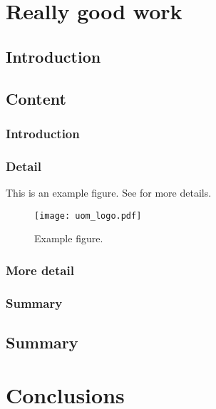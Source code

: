   
  
\chapter{Really good work}

  \section{Introduction}
  \lipsum[1] 
  
  \section{Content}
    \subsection{Introduction}
	\lipsum[1]
	
	\subsection{Detail}
    \lipsum[1-2] \cite{ref:jCAS10,ref:jCAS09,ref:jCAS09a} \lipsum[3-5] This is an example figure. See  for more details. 
	\begin{figure}
      \centering
      \texttt{[image: uom\_logo.pdf]}
      \caption{Example figure.}
      \label{fig:uom_logo}
    \end{figure} 
    
	\subsection{More detail}
	\lipsum[1-2] \cite{ref:jCAS10,ref:jCAS09,ref:jCAS09a} \lipsum[3-5]
	
	\subsection{Summary}
	\lipsum[1]
  
  \section{Summary}
  \lipsum[6]
 



\chapter{Conclusions}



